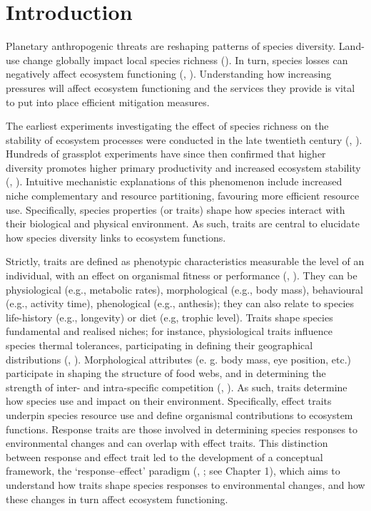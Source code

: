 \section{Introduction}
Planetary anthropogenic threats are reshaping patterns of species diversity. Land-use change globally impact local species richness (\cite{Newbold2015}). In turn, species losses can negatively affect ecosystem functioning (\cite{Hooper2005}, \cite{Hooper2012}). Understanding how increasing pressures will affect ecosystem functioning and the services they provide is vital to put into place efficient mitigation measures.
   
The earliest experiments investigating the effect of species richness on the stability of ecosystem processes were conducted in the late twentieth century (\cite{Tilman1994}, \cite{Naeem1994}). Hundreds of grassplot experiments have since then confirmed that higher diversity promotes higher primary productivity and increased ecosystem stability (\cite{Tilman2014}, \cite{Balvanera2006}). Intuitive mechanistic explanations of this phenomenon include increased niche complementary and resource partitioning, favouring more efficient resource use. Specifically, species properties (or traits) shape how species interact with their biological and physical environment. As such, traits are central to elucidate how species diversity links to ecosystem functions. 

Strictly, traits are defined as phenotypic characteristics measurable the level of an individual, with an effect on organismal fitness or performance (\cite{McGill2006}, \cite{Violle2007}). They can be physiological (e.g., metabolic rates), morphological (e.g., body mass), behavioural (e.g., activity time), phenological (e.g., anthesis); they can also relate to species life-history (e.g., longevity) or diet (e.g, trophic level).
Traits shape species fundamental and realised niches; for instance, physiological traits influence species thermal tolerances, participating in defining their geographical distributions (\cite{Calosi2010}, \cite{Khaliq2017}). Morphological attributes (e. g. body mass, eye position, etc.) participate in shaping the structure of food webs, and in determining the strength of inter- and intra-specific competition (\cite{Gravel2016}, \cite{Laigle2018}). As such, traits determine how species use and impact on their environment. Specifically, effect traits underpin species resource use and define organismal contributions to ecosystem functions. Response traits are those involved in determining species responses to environmental changes and can overlap with effect traits. This distinction between response and effect trait led to the development of a conceptual framework, the `response--effect' paradigm (\cite{Lavorel2002}, \cite{Luck2012}; see Chapter 1), which aims to understand how traits shape species responses to environmental changes, and how these changes in turn affect ecosystem functioning. 

